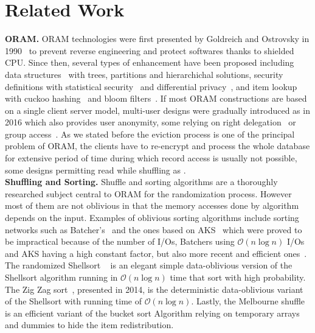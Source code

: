 \documentclass{llncs}
\begin{document}
\section{Related Work}\label{Related}
\noindent\textbf{ORAM.}
ORAM technologies were first presented by Goldreich and Ostrovsky in 1990~\cite{ostrovsky1990efficient} to prevent reverse engineering and protect softwares thanks to shielded CPU.
Since then, several types of enhancement have been proposed including data structures~\cite{goldreich1996software,stefanov2011towards,stefanov2013path,ren2014ring} with trees, partitions and hierarchichal solutions,
security definitions with statistical security~\cite{damgaard2011perfectly,ajtai2010oblivious} and differential privacy~\cite{wagh2016root}, and item lookup with cuckoo hashing~\cite{pinkas2010oblivious} and bloom filters~\cite{williams2008building}.
If most ORAM constructions are based on a single client server model, multi-user designs were gradually introduced as \cite{backesanonymous} in 2016 which also provides user anonymity, some relying on right delegation~\cite{franz2011oblivious} or group access~\cite{goodrich2012privacy}.
As we stated before the eviction process is one of the principal problem of ORAM, the clients have to re-encrypt and process the whole database for extensive period of time during which record access is usually not possible, some designs permitting read while shuffling as \cite{boneh2011}.\\

\noindent\textbf{Shuffling and Sorting.}
Shuffle and sorting algorithms are a thoroughly researched subject central to ORAM for the randomization process. However most of them are not oblivious in that the memory accesses done by algorithm depends on the input.
Examples of oblivious sorting algorithms include sorting networks such as Batcher's~\cite{batcher1968sorting} and the ones based on AKS~\cite{ajtai19830} which were proved to be impractical because of the number of I/Os, Batchers using $\mathcal{O}\left ( n \log n \right)$ I/Os and AKS having a high constant factor, but also more recent and efficient ones~\cite{paterson1990improved}.
The randomized Shellsort ~\cite{goodrich2010randomized} is an elegant simple data-oblivious version of the Shellsort algorithm running in $\mathcal{O}\left ( n \log n \right)$ time that sort with high probability.
The Zig Zag sort~\cite{goodrich2014zig}, presented in 2014, is the deterministic data-oblivious variant of the Shellsort with running time of $\mathcal{O}\left ( n \log n\right)$.
Lastly, the Melbourne shuffle~\cite{ohrimenko2014melbourne} is an efficient variant of the bucket sort Algorithm relying on temporary arrays and dummies to hide the item redistribution.\\
\end{document}
